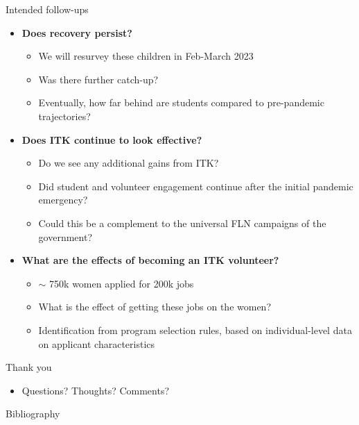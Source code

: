 \documentclass[aspectratio=169,numbering=none]{beamer}
\begin{document}
\begin{frame}[plain]{Intended follow-ups}
\begin{itemize}
 \vfill \item \textbf{Does recovery persist?}
 \begin{itemize}
     \item We will resurvey these children in Feb-March 2023
     \item Was there further catch-up?
     \item Eventually, how far behind are students compared to pre-pandemic trajectories?
 \end{itemize}
 \vfill  \item \textbf{Does ITK continue to look effective?}
\begin{itemize}
   \item Do we see any additional gains from ITK?
    \item Did student and volunteer engagement continue after the initial pandemic emergency?
    \item Could this be a complement to the universal FLN campaigns of the government?
\end{itemize}
 \vfill \item  \textbf{What are the effects of becoming an ITK volunteer?}
\begin{itemize}
     \item $\sim$ 750k women applied for 200k jobs
     \item What is the effect of getting these jobs on the women?
     \item Identification from program selection rules, based on individual-level data on applicant characteristics
\end{itemize}
\end{itemize}
\end{frame}


\begin{frame}[plain]{Thank you}
\begin{itemize}
 \item Questions? Thoughts? Comments?
\end{itemize}
\end{frame}



\appendix
{}


\renewcommand*{\refname}{} %
\begin{frame}{Bibliography}
	

\end{frame}
\end{document}
